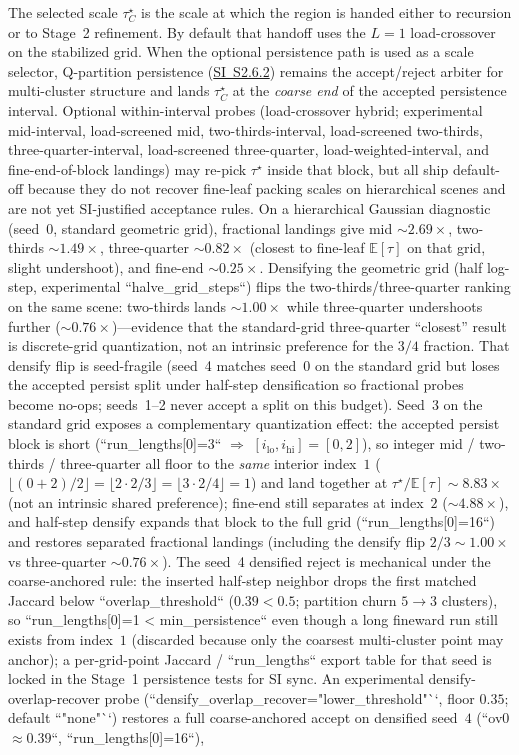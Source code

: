 \documentclass[11pt]{article}
\theoremstyle{definition}
\theoremstyle{plain}
\begin{document}
The selected scale $\tau_C^\star$ is the scale at which the region is handed either to recursion or to Stage~2 refinement. By default that handoff uses the $L=1$ load-crossover on the stabilized grid. When the optional persistence path is used as a scale selector, Q-partition persistence (\hyperref[sec:si-feature-persistence]{SI~S2.6.2}) remains the accept/reject arbiter for multi-cluster structure and lands $\tau_C^\star$ at the \emph{coarse end} of the accepted persistence interval. Optional within-interval probes (load-crossover hybrid; experimental mid-interval, load-screened mid, two-thirds-interval, load-screened two-thirds, three-quarter-interval, load-screened three-quarter, load-weighted-interval, and fine-end-of-block landings) may re-pick $\tau^\star$ inside that block, but all ship default-off because they do not recover fine-leaf packing scales on hierarchical scenes and are not yet SI-justified acceptance rules. On a hierarchical Gaussian diagnostic (seed~0, standard geometric grid), fractional landings give mid $\sim 2.69\times$, two-thirds $\sim 1.49\times$, three-quarter $\sim 0.82\times$ (closest to fine-leaf $\mathbb{E}[\tau]$ on that grid, slight undershoot), and fine-end $\sim 0.25\times$. Densifying the geometric grid (half log-step, experimental ``halve_grid_steps``) flips the two-thirds/three-quarter ranking on the same scene: two-thirds lands $\sim 1.00\times$ while three-quarter undershoots further ($\sim 0.76\times$)---evidence that the standard-grid three-quarter ``closest'' result is discrete-grid quantization, not an intrinsic preference for the $3/4$ fraction. That densify flip is seed-fragile (seed~4 matches seed~0 on the standard grid but loses the accepted persist split under half-step densification so fractional probes become no-ops; seeds~1--2 never accept a split on this budget). Seed~3 on the standard grid exposes a complementary quantization effect: the accepted persist block is short (``run_lengths[0]=3`` $\Rightarrow$ $[i_{\mathrm{lo}},i_{\mathrm{hi}}]=[0,2]$), so integer mid / two-thirds / three-quarter all floor to the \emph{same} interior index~$1$ ($\lfloor(0+2)/2\rfloor=\lfloor 2\cdot 2/3\rfloor=\lfloor 3\cdot 2/4\rfloor=1$) and land together at $\tau^\star/\mathbb{E}[\tau]\sim 8.83\times$ (not an intrinsic shared preference); fine-end still separates at index~$2$ ($\sim 4.88\times$), and half-step densify expands that block to the full grid (``run_lengths[0]=16``) and restores separated fractional landings (including the densify flip $2/3\sim 1.00\times$ vs three-quarter $\sim 0.76\times$). The seed~4 densified reject is mechanical under the coarse-anchored rule: the inserted half-step neighbor drops the first matched Jaccard below ``overlap_threshold`` ($0.39 < 0.5$; partition churn $5\to 3$ clusters), so ``run_lengths[0]=1 < min_persistence`` even though a long fineward run still exists from index~$1$ (discarded because only the coarsest multi-cluster point may anchor); a per-grid-point Jaccard / ``run_lengths`` export table for that seed is locked in the Stage~1 persistence tests for SI sync. An experimental densify-overlap-recover probe (``densify_overlap_recover="lower_threshold"``, floor $0.35$; default ``"none"``) restores a full coarse-anchored accept on densified seed~$4$ (``ov0$\approx 0.39$``, ``run_lengths[0]=16``), 
\end{document}
